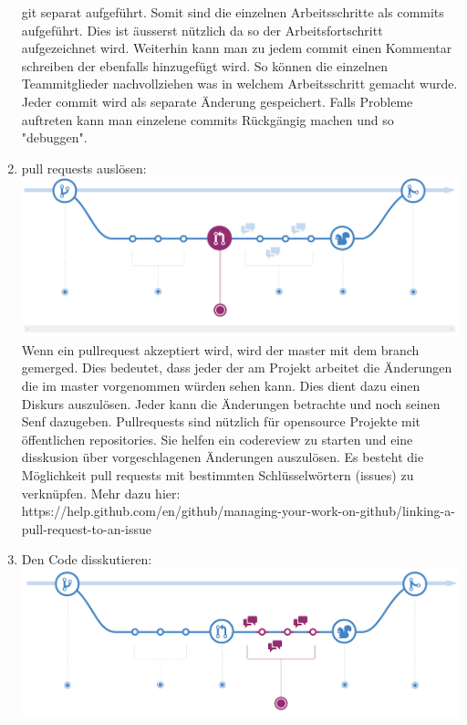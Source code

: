 \documentclass[a4paper, 8pt]{extarticle}
\begin{document}
\begin{multicols*}{3}
\begin{enumerate}
                            git separat aufgeführt. Somit sind die einzelnen Arbeitsschritte als commits aufgeführt. Dies ist äusserst nützlich 
                            da so der Arbeitsfortschritt aufgezeichnet wird. Weiterhin kann man zu jedem commit einen Kommentar schreiben der
                            ebenfalls hinzugefügt wird. So können die einzelnen Teammitglieder nachvollziehen was in welchem Arbeitsschritt 
                            gemacht wurde. Jeder commit wird als separate Änderung gespeichert. Falls Probleme auftreten kann man einzelene
                            commits Rückgängig machen und so "debuggen".
                    \item   pull requests auslösen:\\
                                \includegraphics[width=1\linewidth, left]{img/git_workflow_pullrequest.PNG}\\
                            Wenn ein pullrequest akzeptiert wird, wird der master mit dem branch gemerged. Dies bedeutet, dass
                            jeder der am Projekt arbeitet die Änderungen die im master vorgenommen würden sehen kann. Dies dient dazu
                            einen Diskurs auszulösen. Jeder kann die Änderungen betrachte und noch seinen Senf dazugeben.
                            Pullrequests sind nützlich für opensource Projekte mit öffentlichen repositories. Sie helfen ein 
                            codereview zu starten und eine disskusion über vorgeschlagenen Änderungen auszulösen.
                            Es besteht die Möglichkeit pull requests mit bestimmten Schlüsselwörtern (issues) zu verknüpfen.
                            Mehr dazu hier:\\
                            https://help.github.com/en/github/managing-your-work-on-github/linking-a-pull-request-to-an-issue 
                    \item   Den Code disskutieren:
                                \includegraphics[width=1\linewidth, left]{img/git_workflow_review.PNG}\\

\end{enumerate}
\end{multicols*}
\end{document}
